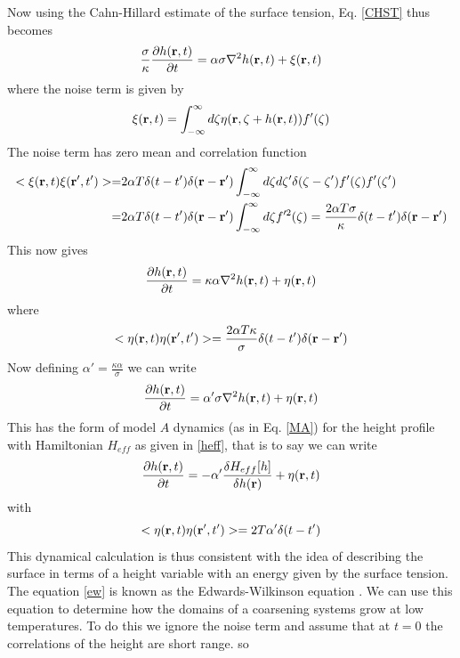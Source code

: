 Now using the Cahn-Hillard estimate of the surface tension, Eq. \eqref{CHST} thus becomes
\begin{equation}
    \frac{\sigma}{\kappa} \frac{\partial h({\bf r},t)}{\partial t} = \alpha\sigma \nabla^2 h({\bf r},t) +\xi({\bf r},t)
\end{equation}
where the noise term is given by
\begin{equation}
    \xi({\bf r},t)= \int_{-\infty}^\infty d\zeta \eta({\bf r},\zeta+ h({\bf r},t))f'(\zeta)
\end{equation}
The noise term has zero mean and correlation function
\begin{align}
    < \xi({\bf r},t)\xi({\bf r}',t')> =&2\alpha T\delta(t-t')\delta({\bf r}-{\bf r}')\int_{-\infty}^\infty d\zeta d\zeta' \delta(\zeta-\zeta')f'(\zeta)f'(\zeta')\nonumber \\
    =& 2\alpha T\delta(t-t')\delta({\bf r}-{\bf r}')\int_{-\infty}^\infty d\zeta f'^2(\zeta)= \frac{2\alpha T\sigma}{\kappa}\delta(t-t')\delta({\bf r}-{\bf r}')
\end{align}
This now gives
\begin{equation}
    \frac{\partial h({\bf r},t)}{\partial t}= \kappa\alpha \nabla^2 h({\bf r},t) + \eta({\bf r},t)
\end{equation}
where 
\begin{equation}
    < \eta({\bf r},t)\eta({\bf r}',t')> = \frac{2\alpha T\kappa}{\sigma}\delta(t-t')\delta({\bf r}-{\bf r}')
\end{equation}
Now defining $\alpha' = \frac{\kappa\alpha}{\sigma}$ we can write
\begin{equation}
    \frac{\partial h({\bf r},t)}{\partial t}= \alpha' \sigma\nabla^2 h({\bf r},t) + \eta({\bf r},t)
\end{equation}
This has the form of model $A$ dynamics (as in Eq. \eqref{MA})  for the height profile with Hamiltonian
$H_{eff}$ as given in \eqref{heff}, that is to say we can write
\begin{equation}
    \frac{\partial h({\bf r},t)}{\partial t}= -\alpha' \frac{\delta H_{eff}[h]}{\delta h({\bf r})} + \eta({\bf r},t)
    \label{ew}
\end{equation}
with
\begin{equation}
    < \eta({\bf r},t)\eta({\bf r}',t')>= 2T\alpha'\delta(t-t')
\end{equation}
This dynamical calculation is thus consistent with the idea of describing the surface in terms of a height variable with an energy given by the surface tension. The equation \eqref{ew} is known as the Edwards-Wilkinson equation \cite{edwards_surface_1982,halpin-healy_kinetic_1995}. We can use this equation to determine how the domains of a coarsening systems grow at low temperatures. To do this we ignore the noise term and assume that at $t=0$ the correlations of the height are short range. so

